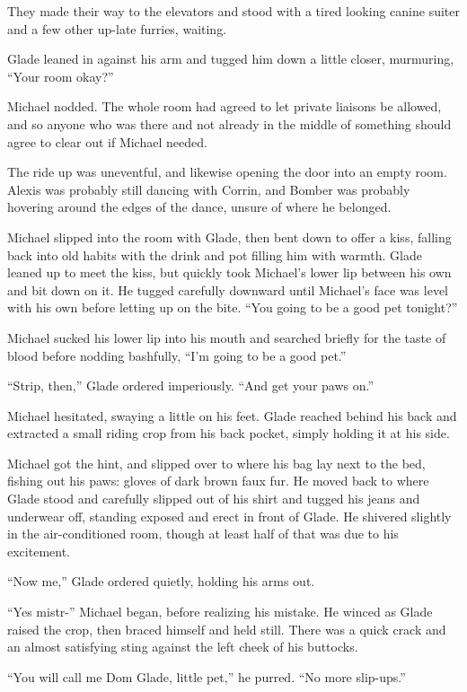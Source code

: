 They made their way to the elevators and stood with a tired looking canine suiter and a few other up-late furries, waiting.

Glade leaned in against his arm and tugged him down a little closer, murmuring, ``Your room okay?''

Michael nodded. The whole room had agreed to let private liaisons be allowed, and so anyone who was there and not already in the middle of something should agree to clear out if Michael needed.

The ride up was uneventful, and likewise opening the door into an empty room. Alexis was probably still dancing with Corrin, and Bomber was probably hovering around the edges of the dance, unsure of where he belonged.

Michael slipped into the room with Glade, then bent down to offer a kiss, falling back into old habits with the drink and pot filling him with warmth. Glade leaned up to meet the kiss, but quickly took Michael's lower lip between his own and bit down on it. He tugged carefully downward until Michael's face was level with his own before letting up on the bite. ``You going to be a good pet tonight?''

Michael sucked his lower lip into his mouth and searched briefly for the taste of blood before nodding bashfully, ``I'm going to be a good pet.''

``Strip, then,'' Glade ordered imperiously. ``And get your paws on.''

Michael hesitated, swaying a little on his feet. Glade reached behind his back and extracted a small riding crop from his back pocket, simply holding it at his side.

Michael got the hint, and slipped over to where his bag lay next to the bed, fishing out his paws: gloves of dark brown faux fur. He moved back to where Glade stood and carefully slipped out of his shirt and tugged his jeans and underwear off, standing exposed and erect in front of Glade. He shivered slightly in the air-conditioned room, though at least half of that was due to his excitement.

``Now me,'' Glade ordered quietly, holding his arms out.

``Yes mistr-'' Michael began, before realizing his mistake. He winced as Glade raised the crop, then braced himself and held still. There was a quick crack and an almost satisfying sting against the left cheek of his buttocks.

``You will call me Dom Glade, little pet,'' he purred. ``No more slip-ups.''

